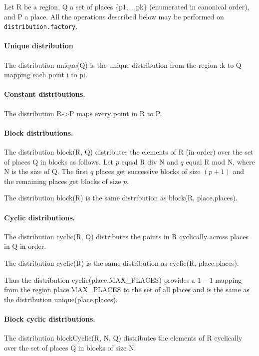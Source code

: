 Let {\cf R} be a region, {\cf Q} a set of places {\cf {}\{p1,...,pk\}}
(enumerated in canonical order), and {\cf P} a place. All the operations
described below may be performed on {\tt distribution.factory}.

\paragraph{Unique distribution} 
The distribution {\cf unique(Q)} is the unique distribution from the
region {:k} to {\cf Q} mapping each point {\cf i} to {\cf pi}.

\paragraph{Constant distributions.} 
The distribution {\cf R->P} maps every point in {\cf R} to {\cf P}.

\paragraph{Block distributions.}
The distribution {\cf block(R, Q)} distributes the elements of {\cf R}
(in order) over the set of places {\cf Q} in blocks  as
follows. Let $p$ equal {\cf R div N} and $q$ equal {\cf R mod N},
where {\cf N} is the size of {\cf Q}. The first $q$ places get
successive blocks of size $(p+1)$ and the remaining places get blocks of
size $p$.

The distribution {\cf block(R)} is the same distribution as {\cf
block(R, place.places)}.

\paragraph{Cyclic distributions.} 
The distribution {\cf cyclic(R, Q)} distributes the points in {\cf R}
cyclically across places in {\cf Q} in order.

The distribution {\cf cyclic(R)} is the same distribution as {\cf 
cyclic(R, place.places)}.

Thus the distribution {\cf cyclic(place.MAX\_PLACES)} provides a $1-1$
mapping from the region {\cf place.MAX\_PLACES} to the set of all
places and is the same as the distribution {\cf unique(place.places)}.

\paragraph{Block cyclic distributions.}
The distribution {\cf blockCyclic(R, N, Q)} distributes the elements
of {\cf R} cyclically over the set of places {\cf Q} in blocks of size
{\cf N}.

